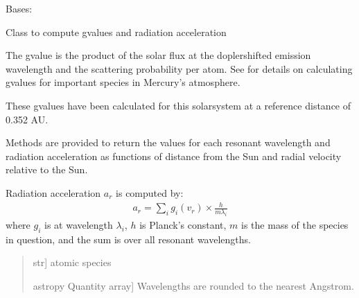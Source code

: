 \documentclass[letterpaper,10pt,english]{sphinxmanual}
\begin{document}
\begin{fulllineitems}
\label{\detokenize{nexoclom2/nexoclom2.atomicdata.gvalues:nexoclom2.atomicdata.gvalues.gValue}}
\pysigstartsignatures
\pysiglinewithargsret
{}
{}
{}
\pysigstopsignatures
\sphinxAtStartPar
Bases: 

\sphinxAtStartPar
Class to compute g\sphinxhyphen{}values and radiation acceleration

\sphinxAtStartPar
The g\sphinxhyphen{}value is the product of the solar flux at the dopler\sphinxhyphen{}shifted
emission wavelength and the scattering probability per atom. See
 for details on calculating
g\sphinxhyphen{}values for important species in Mercury’s atmosphere.

\sphinxAtStartPar
These g\sphinxhyphen{}values have been calculated for this solarsystem at a reference
distance of 0.352 AU.

\sphinxAtStartPar
Methods are provided to return the \sphinxhyphen{}values for each resonant wavelength
and radiation acceleration as functions of distance from the Sun and
radial velocity relative to the Sun.

\sphinxAtStartPar
Radiation acceleration \(a_r\) is computed by:
\begin{equation*}
\begin{split}a_r = \sum_i g_i(v_r) \times \frac{h}{m \lambda_i}\end{split}
\end{equation*}
\sphinxAtStartPar
where \(g_i\) is  at wavelength \(\lambda_i\), \(h\) is
Planck’s constant, \(m\) is the mass of the species in question, and the
sum is over all resonant wavelengths.
\begin{quote}\begin{description}
\begin{description}
\sphinxlineitem{\sphinxstylestrong{species}}{[}str{]}
\sphinxAtStartPar
atomic species

\end{description}

\begin{description}
\sphinxlineitem{\sphinxstylestrong{wavelengths}}{[}astropy Quantity array{]}
\sphinxAtStartPar
Wavelengths are rounded to the nearest Angstrom.


\end{description}
\end{description}
\end{quote}
\end{fulllineitems}
\end{document}
